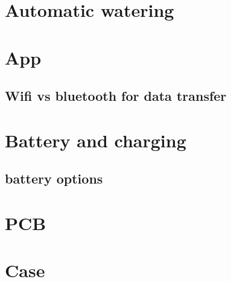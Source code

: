 \section{Automatic watering}

\section{App}
\subsection{Wifi vs bluetooth for data transfer}

\section{Battery and charging}
\label{sec:battery}
\subsection{battery options}

\section{PCB}

\section{Case}
